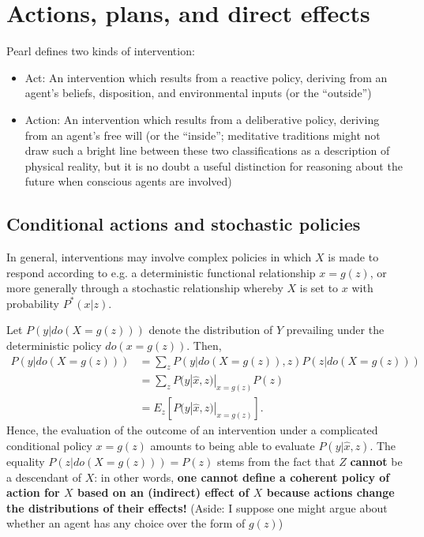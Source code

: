 \documentclass[11pt]{article}
\numberwithin{equation}{section}
\begin{document}
\section{Actions, plans, and direct effects}

Pearl defines two kinds of intervention:

\begin{itemize}[noitemsep]
\item Act: An intervention which results from a reactive policy, deriving from an agent's beliefs, disposition, and environmental inputs (or the ``outside'')
\item Action: An intervention which results from a deliberative policy, deriving from an agent's free will (or the ``inside''; meditative traditions might not draw such a bright line between these two classifications as a  description of physical reality, but it is no doubt a useful distinction for reasoning about the future when conscious agents are involved)
\end{itemize} 

\subsection{Conditional actions and stochastic policies}
In general, interventions may involve complex policies in which $X$ is made to respond according to e.g. a deterministic functional relationship $x=g(z)$, or more generally through a stochastic relationship whereby $X$ is set to $x$ with probability $P^*(x|z)$. 


Let $P(y|do(X=g(z)))$ denote the distribution of $Y$ prevailing under the deterministic policy $do(x=g(z))$. Then,
\begin{align}
P(y|do(X=g(z))) &= \sum_z P(y|do(X=g(z)),z) P(z|do(X=g(z))) \\
&= \sum_z P(y|\hat{x}, z)|_{x=g(z)} P(z) \nonumber \\
&= E_z[P(y|\hat{x},z)|_{x=g(z)}]. \nonumber
\end{align}
Hence, the evaluation of the outcome of an intervention under a complicated conditional policy $x=g(z)$ amounts to being able to evaluate $P(y|\hat{x},z)$. The equality $P(z|do(X=g(z))) = P(z)$ stems from the fact that $Z$ \textbf{cannot} be a descendant of $X$: in other words, \textbf{one cannot define a coherent policy of action for $X$ based on an (indirect) effect of $X$ because actions change the distributions of their effects!} (Aside: I suppose one might argue about whether an agent has any choice over the form of $g(z)$)
\end{document}
